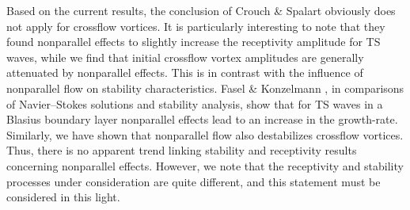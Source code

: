 Based on the current results, the conclusion of Crouch \& Spalart obviously
does not apply for crossflow vortices.  It is particularly interesting to note
that they found nonparallel effects to slightly increase the receptivity
amplitude for TS waves, while we find that initial crossflow vortex amplitudes
are generally attenuated by nonparallel effects.  This is in contrast with the
influence of nonparallel flow on stability characteristics.  Fasel \&
Konzelmann \cite{FaKo:90}, in comparisons of Navier--Stokes solutions and
stability analysis, show that for TS waves in a Blasius boundary layer
nonparallel effects lead to an increase in the growth-rate.  Similarly, we
have shown that nonparallel flow also destabilizes crossflow vortices.  Thus,
there is no apparent trend linking stability and receptivity results
concerning nonparallel effects.  However, we note that the receptivity and
stability processes under consideration are quite different, and this
statement must be considered in this light.

%
%



